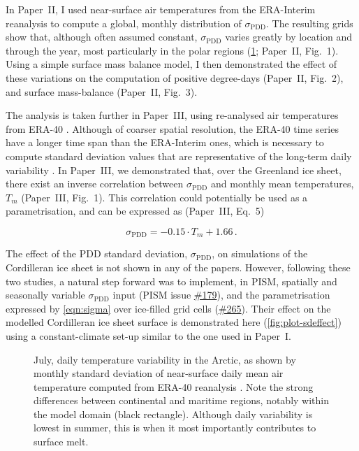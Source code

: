 \documentclass{article}
\newcommand{\sPDD}[0]{\sigma_{\mathrm{PDD}}}
\newcommand{\CCLI}[0]{Paper~I}      %
\newcommand{\PSDV}[0]{Paper~II}     %
\newcommand{\PSDP}[0]{Paper~III}    %
\newcommand{\issue}[1]{\href{https://github.com/pism/pism/issues/#1}{\##1}}
\begin{document}
In \PSDV, I used near-surface air temperatures from the ERA-Interim reanalysis
\citep{Dee.etal.2011} to compute a global, monthly distribution of $\sPDD$.
The resulting grids show
that, although often assumed constant, $\sPDD$ varies greatly by location and
through the year, most particularly in the polar regions
(\cref{fig:plot-sdmap}; \PSDV, Fig.~1). Using a simple surface mass balance
model, I then demonstrated the effect of these variations on the computation of
positive degree-days (\PSDV, Fig.~2), and surface mass-balance (\PSDV, Fig.~3).

The analysis is taken further in \PSDP, using re-analysed air temperatures from
ERA-40 \citep{Uppala.etal.2005}. Although of coarser spatial resolution, the
ERA-40 time series have a longer time span than the ERA-Interim ones, which
is necessary to compute standard deviation values that are representative of
the long-term daily variability \citep{Rogozhina.Rau.2014}. In \PSDP, we
demonstrated that, over the Greenland ice sheet, there exist an inverse
correlation between $\sPDD$ and monthly mean temperatures, $T_m$
(\PSDP, Fig.~1). This correlation could potentially be used as a
parametrisation, and can be expressed as (\PSDP, Eq.~5)

\begin{equation}
    \label{eqn:sigma}
    \sPDD = -0.15 \cdot T_{m} + 1.66\,.
\end{equation}

The effect of the PDD standard deviation, $\sPDD$, on simulations of the
Cordilleran ice sheet is not shown in any of the papers. However, following
these two studies, a natural step forward was to implement, in PISM, spatially
and seasonally variable $\sPDD$ input (PISM issue \issue{179}), and the
parametrisation expressed by \cref{eqn:sigma} over ice-filled grid cells
(\issue{265}). Their effect on the modelled Cordilleran ice sheet surface is
demonstrated here (\cref{fig:plot-sdeffect}) using a constant-climate set-up
similar to the one used in \CCLI.

\begin{figure}
  \centering
  \caption{July, daily temperature variability in the Arctic, as shown by
           monthly standard deviation of near-surface daily mean air
           temperature computed from ERA-40 reanalysis
           \citep{Uppala.etal.2005}. Note the strong differences between
           continental and maritime regions, notably within the model domain
           (black rectangle). Although daily variability is lowest in summer,
           this is when it most importantly contributes to surface melt.}
  \label{fig:plot-sdmap}
\end{figure}
\end{document}
